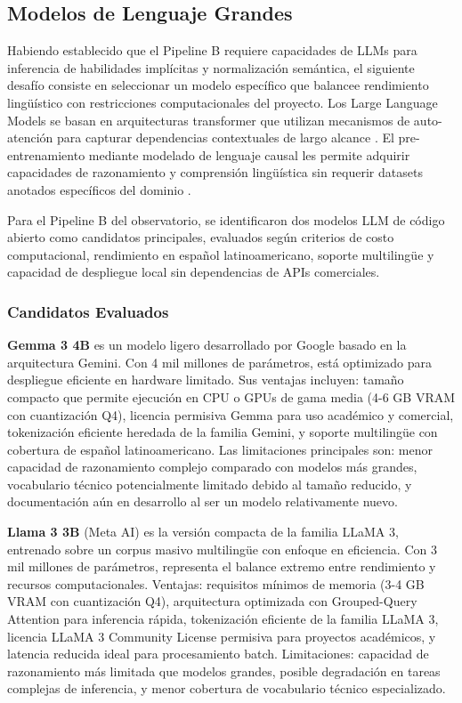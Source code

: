 \subsection{Modelos de Lenguaje Grandes}

Habiendo establecido que el Pipeline B requiere capacidades de LLMs para inferencia de habilidades implícitas y normalización semántica, el siguiente desafío consiste en seleccionar un modelo específico que balancee rendimiento lingüístico con restricciones computacionales del proyecto. Los Large Language Models se basan en arquitecturas transformer que utilizan mecanismos de auto-atención para capturar dependencias contextuales de largo alcance \cite{vaswani2017}. El pre-entrenamiento mediante modelado de lenguaje causal les permite adquirir capacidades de razonamiento y comprensión lingüística sin requerir datasets anotados específicos del dominio \cite{brown2020, wei2022emergent}.

Para el Pipeline B del observatorio, se identificaron dos modelos LLM de código abierto como candidatos principales, evaluados según criterios de costo computacional, rendimiento en español latinoamericano, soporte multilingüe y capacidad de despliegue local sin dependencias de APIs comerciales.

\subsubsection{Candidatos Evaluados}

\textbf{Gemma 3 4B} es un modelo ligero desarrollado por Google basado en la arquitectura Gemini. Con 4 mil millones de parámetros, está optimizado para despliegue eficiente en hardware limitado. Sus ventajas incluyen: tamaño compacto que permite ejecución en CPU o GPUs de gama media (4-6 GB VRAM con cuantización Q4), licencia permisiva Gemma para uso académico y comercial, tokenización eficiente heredada de la familia Gemini, y soporte multilingüe con cobertura de español latinoamericano. Las limitaciones principales son: menor capacidad de razonamiento complejo comparado con modelos más grandes, vocabulario técnico potencialmente limitado debido al tamaño reducido, y documentación aún en desarrollo al ser un modelo relativamente nuevo.

\textbf{Llama 3 3B} (Meta AI) es la versión compacta de la familia LLaMA 3, entrenado sobre un corpus masivo multilingüe con enfoque en eficiencia. Con 3 mil millones de parámetros, representa el balance extremo entre rendimiento y recursos computacionales. Ventajas: requisitos mínimos de memoria (3-4 GB VRAM con cuantización Q4), arquitectura optimizada con Grouped-Query Attention para inferencia rápida, tokenización eficiente de la familia LLaMA 3, licencia LLaMA 3 Community License permisiva para proyectos académicos, y latencia reducida ideal para procesamiento batch. Limitaciones: capacidad de razonamiento más limitada que modelos grandes, posible degradación en tareas complejas de inferencia, y menor cobertura de vocabulario técnico especializado.

